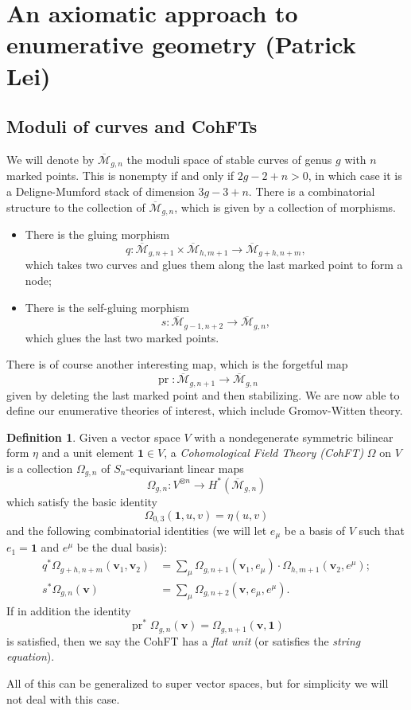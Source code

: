 \documentclass[10pt]{amsart}
\theoremstyle{definition}
\newtheorem{defn}[thm]{Definition}
\theoremstyle{remark}
\theoremstyle{plain}
\theoremstyle{definition}
\theoremstyle{remark}
\newcommand{\Mbar}{\overline{\mathcal{M}}}
\newcommand{\mbf}[1]{\mathbf{#1}}
\newcommand{\bv}{\mbf{v}}
\newcommand{\1}{\mathbf{1}}
\newcommand{\2}{\mathbf{2}}
\newcommand{\3}{\mathbf{3}}
\DeclareMathOperator{\pr}{pr}
\begin{document}
\section{An axiomatic approach to enumerative geometry (Patrick Lei)}%
\label{sec:An axiomatic approach to enumerative geometry (Patrick Lei)}

\subsection{Moduli of curves and CohFTs}%
\label{sub:Moduli of curves and CohFTs}

We will denote by $\Mbar_{g,n}$ the moduli space of stable curves of genus $g$ with $n$ marked points. This is nonempty if and only if $2g-2+n > 0$, in which case it is a Deligne-Mumford stack of dimension $3g-3+n$. There is a combinatorial structure to the collection of $\Mbar_{g,n}$, which is given by a collection of morphisms.
\begin{itemize}
    \item There is the gluing morphism 
        \[q \colon \Mbar_{g,n+1} \times \Mbar_{h, m+1} \to \Mbar_{g+h,n+m}, \] 
        which takes two curves and glues them along the last marked point to form a node;
    \item There is the self-gluing morphism \[s \colon \Mbar_{g-1,n+2} \to \Mbar_{g,n},\] 
        which glues the last two marked points.
\end{itemize} 
There is of course another interesting map, which is the forgetful map
\[ \pr \colon \Mbar_{g,n+1} \to \Mbar_{g,n} \]
given by deleting the last marked point and then stabilizing. We are now able to define our enumerative theories of interest, which include Gromov-Witten theory.

\begin{defn}
    Given a vector space $V$ with a nondegenerate symmetric bilinear form $\eta$ and a unit element $\1 \in V$, a \textit{Cohomological Field Theory (CohFT)} $\Omega$ on $V$ is a collection $\Omega_{g,n}$ of $S_n$-equivariant linear maps
    \[ \Omega_{g,n} \colon V^{\otimes n} \to H^*(\Mbar_{g,n}) \]
    which satisfy the basic identity
    \[ \Omega_{0,3}(\1, u,v) = \eta(u,v) \]
    and the following combinatorial identities (we will let $e_{\mu}$ be a basis of $V$ such that $e_1 = \1$ and $e^{\mu}$ be the dual basis):
    \begin{align*}
        q^* \Omega_{g+h,n+m}(\bv_1, \bv_2) &= \sum_{\mu} \Omega_{g,n+1}(\bv_1, e_{\mu}) \cdot \Omega_{h,m+1}(  \bv_2, e^{\mu} ); \\
        s^* \Omega_{g,n}(\bv) &= \sum_{\mu} \Omega_{g,n+2}(\bv, e_{\mu}, e^{\mu}).
    \end{align*}
    If in addition the identity
    \[ \pr^*\Omega_{g,n}(\bv) = \Omega_{g,n+1}(\bv,\1) \]
    is satisfied, then we say the CohFT has a \textit{flat unit} (or satisfies the \textit{string equation}).
\end{defn}
All of this can be generalized to super vector spaces, but for simplicity we will not deal with this case.
\end{document}
